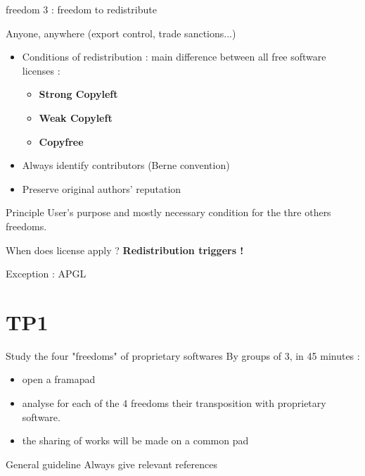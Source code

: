 \documentclass{beamer}
\begin{document}
\begin{frame}{freedom 3 : freedom to redistribute}

Anyone, anywhere (export control, trade sanctions...)

  \begin{itemize}
  \item Conditions of redistribution : main difference between all free software licenses :
    \begin{itemize}
    \item \textbf{Strong Copyleft}
    \item \textbf{Weak Copyleft}
    \item \textbf{Copyfree}
    \end{itemize}
  \item Always identify contributors (Berne convention)
  \item Preserve original authors' reputation
  \end{itemize}
\begin{alertblock}{Principle}
    User's purpose and mostly necessary condition for the thre others freedoms.
  \end{alertblock}

\begin{alertblock}{When does license apply ?}
\textbf{Redistribution triggers !}
 \end{alertblock}
 
 Exception : APGL
\end{frame}

\section{TP1}

\begin{frame}{Study the four "freedoms" of proprietary softwares}
  By groups of 3, in 45 minutes :
  \begin{itemize}
  \item open a framapad
  \item analyse for each of the 4 freedoms their transposition with proprietary software.
  \item the sharing of works will be made on a common pad
  \end{itemize}

  \begin{alertblock}{General guideline}
	Always give relevant references 
  \end{alertblock}
\end{frame}
\end{document}
